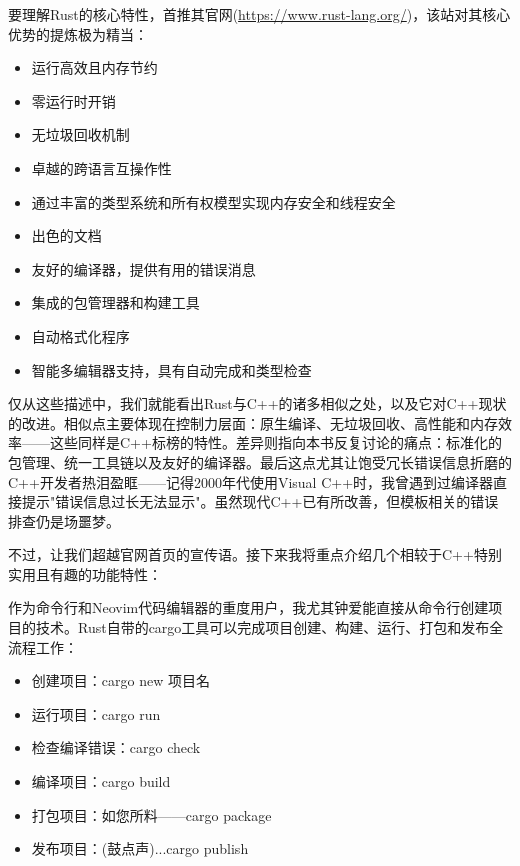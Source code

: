 
要理解Rust的核心特性，首推其官网(\url{https://www.rust-lang.org/})，该站对其核心优势的提炼极为精当：

\begin{itemize}
\item 
运行高效且内存节约

\item 
零运行时开销

\item 
无垃圾回收机制

\item 
卓越的跨语言互操作性

\item 
通过丰富的类型系统和所有权模型实现内存安全和线程安全

\item 
出色的文档

\item 
友好的编译器，提供有用的错误消息

\item 
集成的包管理器和构建工具

\item 
自动格式化程序

\item 
智能多编辑器支持，具有自动完成和类型检查
\end{itemize}

仅从这些描述中，我们就能看出Rust与C++的诸多相似之处，以及它对C++现状的改进。相似点主要体现在控制力层面：原生编译、无垃圾回收、高性能和内存效率——这些同样是C++标榜的特性。差异则指向本书反复讨论的痛点：标准化的包管理、统一工具链以及友好的编译器。最后这点尤其让饱受冗长错误信息折磨的C++开发者热泪盈眶——记得2000年代使用Visual C++时，我曾遇到过编译器直接提示"错误信息过长无法显示"。虽然现代C++已有所改善，但模板相关的错误排查仍是场噩梦。

不过，让我们超越官网首页的宣传语。接下来我将重点介绍几个相较于C++特别实用且有趣的功能特性：


作为命令行和Neovim代码编辑器的重度用户，我尤其钟爱能直接从命令行创建项目的技术。Rust自带的cargo工具可以完成项目创建、构建、运行、打包和发布全流程工作：

\begin{itemize}
\item 
创建项目：cargo new 项目名

\item 
运行项目：cargo run

\item 
检查编译错误：cargo check

\item 
编译项目：cargo build

\item 
打包项目：如您所料——cargo package

\item 
发布项目：(鼓点声)...cargo publish
\end{itemize}

